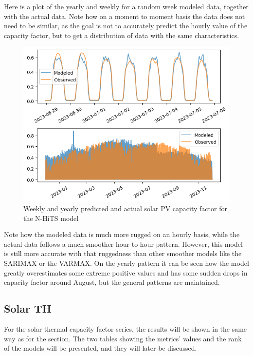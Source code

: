 Here is a plot of the yearly and weekly for a random week modeled data, together with the actual data. Note how on a moment to moment basis the data does not need to be similar, as the goal is not to accurately predict the hourly value of the capacity factor, but to get a distribution of data with the same characteristics. 
\begin{figure}[ht]
    \centering
    \captionsetup{justification=centering}
    \includegraphics[width=0.7\linewidth]{assets/nhits-solar-pv.png}
    \caption{Weekly and yearly predicted and actual solar PV capacity factor for the N-HiTS model}
    \label{fig:nhits-solar-pv}
\end{figure}
Note how the modeled data is much more rugged on an hourly basis, while the actual data follows a much smoother hour to hour pattern. However, this model is still more accurate with that ruggedness than other smoother models like the SARIMAX or the VARMAX.  
On the yearly pattern it can be seen how the model greatly overestimates some extreme positive values and has some sudden drops in capacity factor around August, but the general patterns are maintained. 
\subsection{Solar TH}
For the solar thermal capacity factor series, the results will be shown in the same way as for the  section. The two tables showing the metrics' values and the rank of the models will be presented, and they will later be discussed. 

